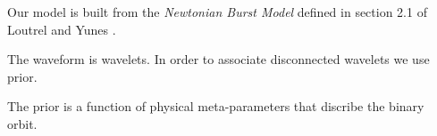 
Our model is built from the \textit{Newtonian Burst Model} defined in section 2.1 of Loutrel and Yunes \cite{ly2017}.

The waveform is wavelets.
In order to associate disconnected wavelets we use prior.

The prior is a function of physical meta-parameters that discribe the binary orbit.


